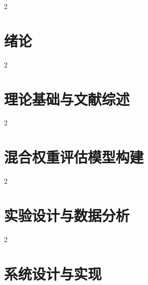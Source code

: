 \documentclass[twoside]{CUGThesis}
\begin{document}

\begin{spacing}{2}
\section{绪论}
\end{spacing}
\label{sec:introduction}



\begin{spacing}{2}
\section{理论基础与文献综述}
\end{spacing}
\label{sec:literature}



\begin{spacing}{2}
\section{混合权重评估模型构建}
\end{spacing}
\label{sec:model}



\begin{spacing}{2}
\section{实验设计与数据分析}
\end{spacing}
\label{sec:experiments}



\begin{spacing}{2}
\section{系统设计与实现}
\end{spacing}
\label{sec:system}


\end{document}
